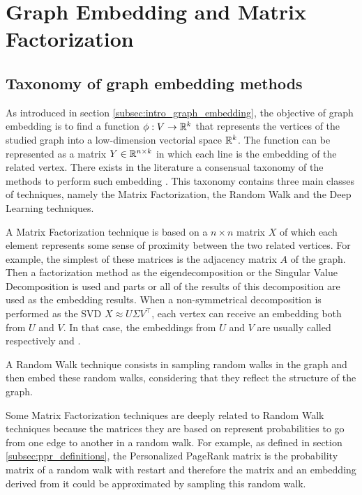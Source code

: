 \section{Graph Embedding and Matrix Factorization}
\subsection{Taxonomy of graph embedding methods}
As introduced in section \ref{subsec:intro_graph_embedding}, the objective of graph embedding is to find a function $\phi: V \rightarrow \mathbb{R}^k$ that represents the vertices of the studied graph into a low-dimension vectorial space $\mathbb{R}^k$. The function can be represented as a matrix $Y \in \mathbb{R}^{n\times k}$ in which each line is the embedding of the related vertex. There exists in the literature a consensual taxonomy of the methods to perform such embedding \cite{cai2018_ComprehensiveSurveyGraph, goyal2018_GraphEmbeddingTechniques}. This taxonomy contains three main classes of techniques, namely the Matrix Factorization, the Random Walk and the Deep Learning techniques.

A Matrix Factorization technique is based on a $n \times n$ matrix $X$ of which each element represents some sense of proximity between the two related vertices. For example, the simplest of these matrices is the adjacency matrix $A$ of the graph. Then a factorization method as the eigendecomposition or the Singular Value Decomposition is used and parts or all of the results of this decomposition are used as the embedding results. When a non-symmetrical decomposition is performed as the SVD $X \approx U \Sigma V^\top$, each vertex can receive an embedding both from $U$ and $V$. In that case, the embeddings from $U$ and $V$ are usually called respectively  and .

A Random Walk technique consists in sampling random walks in the graph and then embed these random walks, considering that they reflect the structure of the graph.

Some Matrix Factorization techniques are deeply related to Random Walk techniques because the matrices they are based on represent probabilities to go from one edge to another in a random walk. For example, as defined in section \ref{subsec:ppr_definitions}, the Personalized PageRank matrix is the probability matrix of a random walk with restart and therefore the matrix and an embedding derived from it could be approximated by sampling this random walk.

